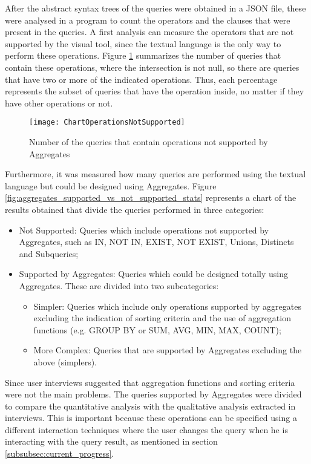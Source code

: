 After the abstract syntax trees of the queries were obtained in a JSON file, these were analysed in a program to count the operators and the clauses that were present in the queries. A first analysis can measure the operators that are not supported by the visual tool, since the textual language is the only way to perform these operations. Figure \ref{fig:aggregates_operations_not_supported_stats} summarizes the number of queries that contain these operations, where the intersection is not null, so there are queries that have two or more of the indicated operations. Thus, each percentage represents the subset of queries that have the operation inside, no matter if they have other operations or not.

\begin{figure}[htbp]
	\centering
	\texttt{[image: ChartOperationsNotSupported]}
	\caption{Number of the queries that contain operations not supported by Aggregates}
	\label{fig:aggregates_operations_not_supported_stats}
\end{figure}

Furthermore, it was measured how many queries are performed using the textual language but could be designed using Aggregates. Figure \ref{fig:aggregates_supported_vs_not_supported_stats} represents a chart of the results obtained that divide the queries performed in three categories:

\begin{itemize}
    \item Not Supported: Queries which include operations not supported by Aggregates, such as IN, NOT IN, EXIST, NOT EXIST, Unions, Distincts and Subqueries;
    \item Supported by Aggregates: Queries which could be designed totally using Aggregates. These are divided into two subcategories:
    \begin{itemize}
        \item Simpler: Queries which include only operations supported by aggregates excluding the indication of sorting criteria and the use of aggregation functions (e.g. GROUP BY or SUM, AVG, MIN, MAX, COUNT);
        \item More Complex: Queries that are supported by Aggregates excluding the above (simplers).
    \end{itemize}
\end{itemize}

Since user interviews suggested that aggregation functions and sorting criteria were not the main problems. The queries supported by Aggregates were divided to compare the quantitative analysis with the qualitative analysis extracted in interviews. This is important because these operations can be specified using a different interaction techniques where the user changes the query when he is interacting with the query result, as mentioned in section \ref{subsubsec:current_progress}. 

